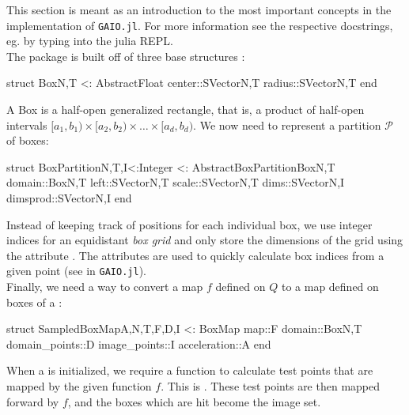 This section is meant as an introduction to the most important concepts in the implementation of 
\texttt{GAIO.jl}. For more information see the respective docstrings, eg. by typing 
 into the julia REPL.\\

The package is built off of three base structures :

\begin{jllisting}[language=julia, style=jlcodestyle]
    struct Box{N,T <: AbstractFloat}
        center::SVector{N,T}
        radius::SVector{N,T}
    end
\end{jllisting}

A Box is a half-open generalized rectangle, that is, a product of half-open intervals
$[a_1, b_1) \times [a_2, b_2) \times \ldots \times [a_d, b_d)$. We now need to represent 
a partition $\mathcal{P}$ of boxes:

\begin{jllisting}[language=julia, style=jlcodestyle]
    struct BoxPartition{N,T,I<:Integer} <: AbstractBoxPartition{Box{N,T}}
        domain::Box{N,T}
        left::SVector{N,T}
        scale::SVector{N,T}
        dims::SVector{N,I}
        dimsprod::SVector{N,I}
    end
\end{jllisting}

Instead of keeping track of positions for each individual box, we use integer indices 
for an equidistant \emph{box grid} and only store the dimensions of the grid using 
the attribute . The attributes  are used to 
quickly calculate box indices from a given point (see  
in \texttt{GAIO.jl}).\\

Finally, we need a way to convert a map $f$ defined on $Q$ to a map  defined on 
boxes of a :

\begin{jllisting}[language=julia, style=jlcodestyle]
    struct SampledBoxMap{A,N,T,F,D,I} <: BoxMap
        map::F
        domain::Box{N,T}
        domain_points::D
        image_points::I
        acceleration::A
    end
\end{jllisting}

When a  is initialized, we require a function to calculate test 
points that are mapped by the given function $f$. This is . These test 
points are then mapped forward by $f$, and the boxes which are hit become the image set.\\

